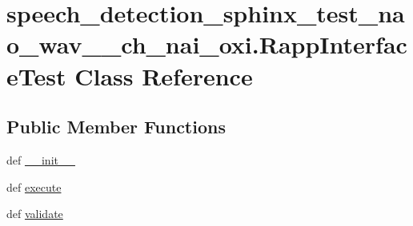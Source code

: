 \hypertarget{classspeech__detection__sphinx__test__nao__wav__1__ch__nai__oxi_1_1RappInterfaceTest}{\section{speech\-\_\-detection\-\_\-sphinx\-\_\-test\-\_\-nao\-\_\-wav\-\_\-\_\-ch\-\_\-nai\-\_\-oxi.\-Rapp\-Interface\-Test Class Reference}
\label{classspeech__detection__sphinx__test__nao__wav__1__ch__nai__oxi_1_1RappInterfaceTest}
}
\subsection*{Public Member Functions}
\begin{DoxyCompactItemize}
\item 
def \hyperlink{classspeech__detection__sphinx__test__nao__wav__1__ch__nai__oxi_1_1RappInterfaceTest_a68f94f75043684acc009d8ea319d6171}{\-\_\-\-\_\-init\-\_\-\-\_\-}
\item 
def \hyperlink{classspeech__detection__sphinx__test__nao__wav__1__ch__nai__oxi_1_1RappInterfaceTest_ab7c4f7ffca592a9888268f09e920d7a6}{execute}
\item 
def \hyperlink{classspeech__detection__sphinx__test__nao__wav__1__ch__nai__oxi_1_1RappInterfaceTest_a39fde2d058ddec6a08aded5c791c7c56}{validate}
\end{DoxyCompactItemize}
